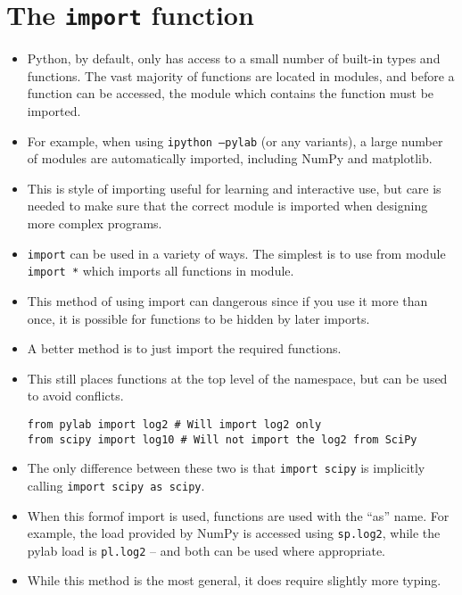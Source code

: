 \documentclass[Pydata.tex]{subfiles}
\begin{document}
 
\newpage
\section{The \texttt{import} function}
\begin{itemize}
\item Python, by default, only has access to a small number of built-in types and functions. The vast majority of
functions are located in modules, and before a function can be accessed, the module which contains the
function must be imported. 

\item For example, when using \texttt{ipython --pylab} (or any variants), a large number
of modules are automatically imported, including NumPy and matplotlib.
\item This is style of importing useful
for learning and interactive use, but care is needed to make sure that the correct module is imported when
designing more complex programs.

\item \texttt{import} can be used in a variety of ways. The simplest is to use from module \texttt{import *} which imports
all functions in module. 
\item This method of using import can dangerous since if you use it more than once,
it is possible for functions to be hidden by later imports. 
\item A better method is to just import the required
functions. 
\item This still places functions at the top level of the namespace, but can be used to avoid conflicts.
\begin{framed}
\begin{verbatim}
from pylab import log2 # Will import log2 only
from scipy import log10 # Will not import the log2 from SciPy
\end{verbatim}
\end{framed}
\item The only difference between these two is that \texttt{import scipy} is implicitly calling \texttt{import scipy as scipy}.
\item When this formof import is used, functions are used with the “as” name. For example, the load provided
by NumPy is accessed using \texttt{sp.log2}, while the pylab load is \texttt{pl.log2} – and both can be used where appropriate.
\item While this method is the most general, it does require slightly more typing.
\end{itemize}
\end{document}

